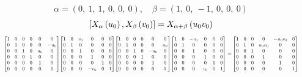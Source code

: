 \documentclass[11pt]{article}
\theoremstyle{definition}
\begin{document}
\[
\alpha = \left( 0, \  1, \  1, \  0, \  0, \  0\right), \quad \beta = \left( 1, \  0, \  -1, \  0, \  0, \  0\right)
\]
\[
\scaletoalign{\textwidth}{\left[ X_{\alpha}\left(u_{0}\right), X_{\beta}\left(v_{0}\right) \right] = X_{\alpha + \beta}\left(u_{0} v_{0}\right)}
\]
\[
\scaletoalign{\textwidth}{{\left[\begin{matrix}1 & 0 & 0 & 0 & 0 & 0\\0 & 1 & 0 & 0 & 0 & - u_{0}\\0 & 0 & 1 & 0 & u_{0} & 0\\0 & 0 & 0 & 1 & 0 & 0\\0 & 0 & 0 & 0 & 1 & 0\\0 & 0 & 0 & 0 & 0 & 1\end{matrix}\right]} {\left[\begin{matrix}1 & 0 & v_{0} & 0 & 0 & 0\\0 & 1 & 0 & 0 & 0 & 0\\0 & 0 & 1 & 0 & 0 & 0\\0 & 0 & 0 & 1 & 0 & 0\\0 & 0 & 0 & 0 & 1 & 0\\0 & 0 & 0 & - v_{0} & 0 & 1\end{matrix}\right]} {\left[\begin{matrix}1 & 0 & 0 & 0 & 0 & 0\\0 & 1 & 0 & 0 & 0 & u_{0}\\0 & 0 & 1 & 0 & - u_{0} & 0\\0 & 0 & 0 & 1 & 0 & 0\\0 & 0 & 0 & 0 & 1 & 0\\0 & 0 & 0 & 0 & 0 & 1\end{matrix}\right]} {\left[\begin{matrix}1 & 0 & - v_{0} & 0 & 0 & 0\\0 & 1 & 0 & 0 & 0 & 0\\0 & 0 & 1 & 0 & 0 & 0\\0 & 0 & 0 & 1 & 0 & 0\\0 & 0 & 0 & 0 & 1 & 0\\0 & 0 & 0 & v_{0} & 0 & 1\end{matrix}\right]} = {\left[\begin{matrix}1 & 0 & 0 & 0 & - u_{0} v_{0} & 0\\0 & 1 & 0 & u_{0} v_{0} & 0 & 0\\0 & 0 & 1 & 0 & 0 & 0\\0 & 0 & 0 & 1 & 0 & 0\\0 & 0 & 0 & 0 & 1 & 0\\0 & 0 & 0 & 0 & 0 & 1\end{matrix}\right]}}
\]
\end{document}
